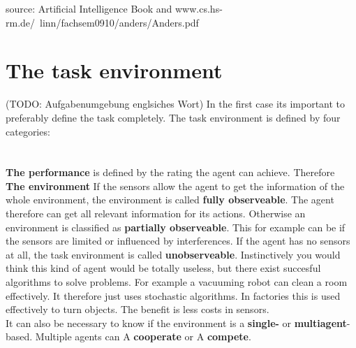 \documentclass[10pt,a4paper,DIV=11]{scrreprt}
\begin{document}
source: Artificial Intelligence Book and www.cs.hs-rm.de/~linn/fachsem0910/anders/Anders.pdf


\section{The task environment}
(TODO: Aufgabenumgebung englsiches Wort)
In the first case its important to preferably define the task completely. The task environment is defined by four categories: \\

   \\
\\

\textbf{The performance} is defined by the rating the agent can achieve. Therefore \\

\textbf{The environment}
If the sensors allow the agent to get the information of the whole environment, the environment is called \textbf{fully observeable}. The agent therefore can get all relevant information for its actions. Otherwise an environment is classified as \textbf{partially observeable}. This for example can be if the sensors are limited or influenced by interferences.
If the agent has no sensors at all, the task environment is called \textbf{unobserveable}. Instinctively you would think this kind of agent would be totally useless, but there exist succesful algorithms to solve problems. For example a vacuuming robot can clean a room effectively. It therefore just uses stochastic algorithms. In factories this is used effectively to  turn objects. The benefit is less costs in sensors. \\

It can also be necessary to know if the environment is a \textbf{single-} or \textbf{multiagent}-based. Multiple agents can A \textbf{cooperate} or A \textbf{compete}. \\
\end{document}
